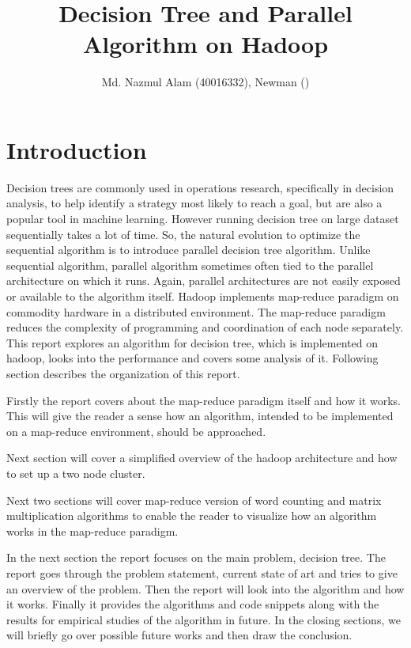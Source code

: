 \documentclass{article}
\title{Decision Tree and Parallel Algorithm on Hadoop}
\author{Md. Nazmul Alam (40016332), Newman ()}
\begin{document}
\maketitle
\newpage
\tableofcontents
\listofalgorithms
\lstlistoflistings
{}
\newpage
\section{Introduction}
Decision trees are commonly used in operations research, specifically in decision analysis, to help identify a strategy most likely to reach a goal, but are also a popular tool in machine learning\cite{wikidt}. However running decision tree on large dataset sequentially takes a lot of time. So, the natural evolution to optimize the sequential algorithm is to introduce parallel decision tree algorithm. Unlike sequential algorithm, parallel algorithm sometimes often tied to the parallel architecture on which it runs. Again, parallel architectures are not easily exposed or available to the algorithm itself. Hadoop implements map-reduce paradigm on commodity hardware in a distributed environment. The map-reduce paradigm reduces the complexity of programming and coordination of each node separately.
\BlankLine This report explores an algorithm for decision tree, which is implemented on hadoop, looks into the performance and covers some analysis of it. Following section describes the organization of this report.\BlankLine

Firstly the report covers about the map-reduce paradigm itself and how it works. This will give the reader a sense how an algorithm, intended to be implemented on a map-reduce environment, should be approached.

Next section will cover a simplified overview of the hadoop architecture and how to set up a two node cluster.

Next two sections will cover map-reduce version of word counting and matrix multiplication algorithms to enable the reader to visualize how an algorithm works in the map-reduce paradigm.

In the next section the report focuses on the main problem, decision tree. The report goes through the problem statement, current state of art and tries to give an overview of the problem. Then the report will look into the algorithm and how it works. Finally it provides the algorithms and code snippets along with the results for empirical studies of the algorithm in future.
In the closing sections, we will briefly go over possible future works and then draw the conclusion.
\end{document}
